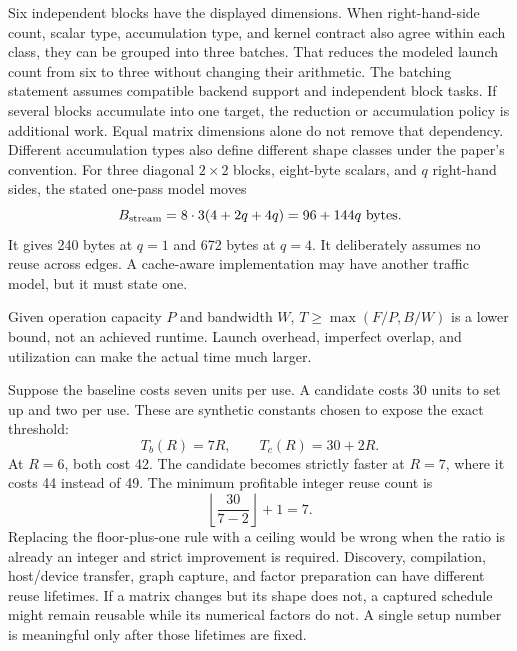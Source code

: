 Six independent blocks have the displayed dimensions. When right-hand-side count, scalar type, accumulation type, and kernel contract also agree within each class, they can be grouped into three batches. That reduces the modeled launch count from six to three without changing their arithmetic.
The batching statement assumes compatible backend support and independent block tasks. If several blocks accumulate into one target, the reduction or accumulation policy is additional work. Equal matrix dimensions alone do not remove that dependency. Different accumulation types also define different shape classes under the paper's convention.
For three diagonal $2\times2$ blocks, eight-byte scalars, and $q$ right-hand sides, the stated one-pass model moves
\[
B_{\rm stream}=8\cdot3(4+2q+4q)=96+144q\text{ bytes}.
\]
It gives 240 bytes at $q=1$ and 672 bytes at $q=4$. It deliberately assumes no reuse across edges. A cache-aware implementation may have another traffic model, but it must state one.

Given operation capacity $P$ and bandwidth $W$, $T\ge\max(F/P,B/W)$ is a lower bound, not an achieved runtime. Launch overhead, imperfect overlap, and utilization can make the actual time much larger.

Suppose the baseline costs seven units per use. A candidate costs 30 units to set up and two per use. These are synthetic constants chosen to expose the exact threshold:
\[
T_b(R)=7R,\qquad T_c(R)=30+2R.
\]
At $R=6$, both cost 42. The candidate becomes strictly faster at $R=7$, where it costs 44 instead of 49. The minimum profitable integer reuse count is
\[
\left\lfloor\frac{30}{7-2}\right\rfloor+1=7.
\]
Replacing the floor-plus-one rule with a ceiling would be wrong when the ratio is already an integer and strict improvement is required.
Discovery, compilation, host/device transfer, graph capture, and factor preparation can have different reuse lifetimes. If a matrix changes but its shape does not, a captured schedule might remain reusable while its numerical factors do not. A single setup number is meaningful only after those lifetimes are fixed.

